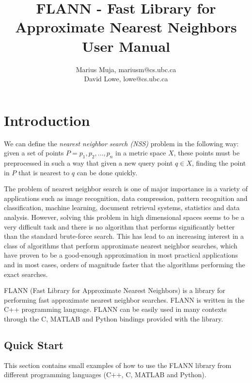 \documentclass[letter,10pt]{article}
\title{FLANN - Fast Library for Approximate Nearest Neighbors\\[0.5cm] User
Manual\\[1cm]}
\author{Marius Muja, mariusm@cs.ubc.ca\\David Lowe, lowe@cs.ubc.ca}
\begin{document}
 \begin{titlepage}
\vspace{10cm}
\maketitle
\thispagestyle{empty}
 \end{titlepage}


\section{Introduction}

We can define the \emph{nearest neighbor search (NSS)} problem in the
following way: given a set of points $P=p_1,p_2,\dots,p_n$ in a metric
space $X$, these points must be preprocessed in such a way that given a new
query point $q \in X$, finding the point in $P$ that is nearest to $q$ can
be done quickly.

The problem of nearest neighbor search is one of major importance in a
variety of applications such as image recognition, data compression,
pattern recognition and classification, machine learning,  document
retrieval systems, statistics and data analysis. However, solving this
problem in high dimensional spaces seems to be a very difficult task and
there is no algorithm that performs significantly better than the standard
brute-force search. This has lead to an increasing interest in a class of
algorithms that perform approximate nearest neighbor searches, which have
proven to be a good-enough approximation in most practical applications and
in most cases, orders of magnitude faster that the algorithms performing
the exact searches.

FLANN (Fast Library for Approximate Nearest Neighbors) is a library for
performing fast approximate nearest neighbor searches. FLANN is written in
the C++ programming language. FLANN can be easily used in many contexts
through the C, MATLAB and Python bindings provided with the library.



\subsection{Quick Start}
\label{sec:quickstart}


This section contains small examples of how to use the FLANN library from
different programming languages (C++, C, MATLAB and Python).
\end{document}
